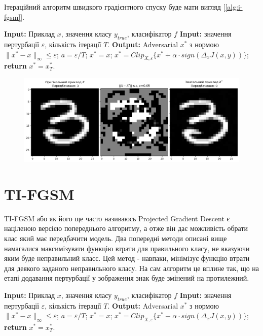 \documentclass[a4paper,14pt]{extreport}
\renewcommand{\algorithmicrequire}{\textbf{Input: }}
\renewcommand{\algorithmicensure}{\textbf{Output: }}
\newcommand{\algorithmreturn}{\textbf{return }}
\begin{document}
	Ітераційний алгоритм швидкого градієнтного спуску буде мати вигляд [\ref{alg:i-fgsm}].
	
	\begin{algorithm}
		\caption{$I-FGSM$}
		\label{alg:i-fgsm}
		\begin{algorithmic}[1]
			\State \algorithmicrequire{Приклад $x$, значення класу $y_{true}$, класифікатор $f$}
			\State \algorithmicrequire{значення пертурбації $\varepsilon$, кількість ітерації $T$.}
			\State \algorithmicensure{ Adversarial $x^{*}$ з нормою $\|x^{*} - x\|_{\infty} \leq \varepsilon $;}
			\State $a = \varepsilon / T $;
			\State $x^{*} = x$;
			\State $x^{*} = Clip_{X, \varepsilon} \big\{ x^{*} + \alpha \cdot  sign(\Delta_x J(x, y)) \big\}$;
			\EndFor
			\State \algorithmreturn{$x^{*} = x^{*}_{T}$}.
		\end{algorithmic}
	\end{algorithm}
		
		
	\begin{figure}[h]
		\centering
		\includegraphics[width=\textwidth]{resources/i-fgsm-example.png}
		\caption{}
		\label{fig:i-fgsm-example}
	\end{figure}
		
	\newpage
	\section{TI-FGSM}
	TI-FGSM або як його ще часто називаюсь Projected Gradient Descent є націленою версією попереднього алгоритму, а отже він дає можливість обрати клас який має передбачити модель. Два попередні методи описані вище намагалися максимізувати функцію втрати для правильного класу, не вказуючи яким буде неправильний класс. Цей метод - навпаки, мінімізує функцію втрати для деякого заданого неправильного класу. На сам алгоритм це вплине так, що на етапі додавання пертурбації у зображення знак буде змінений на протилежний.

	\begin{algorithm}
		\caption{$TI-FGSM$}
		\label{alg:ti-fgsm}
		\begin{algorithmic}[1]
			\State \algorithmicrequire{Приклад $x$, значення класу $y_{true}$, класифікатор $f$}
			\State \algorithmicrequire{значення пертурбації $\varepsilon$, кількість ітерації $T$.}
			\State \algorithmicensure{ Adversarial $x^{*}$ з нормою $\|x^{*} - x\|_{\infty} \leq \varepsilon $;}
			\State $a = \varepsilon / T $;
			\State $x^{*} = x$;
			\For{$t=0 \; to \; T-1$}
			\State $x^{*} = Clip_{X, \varepsilon} \big\{ x^{*} - \alpha \cdot  sign(\Delta_x J(x, y)) \big\}$;
			\EndFor
			\State \algorithmreturn{$x^{*} = x^{*}_{T}$}.
		\end{algorithmic}
	\end{algorithm}
\end{document}
